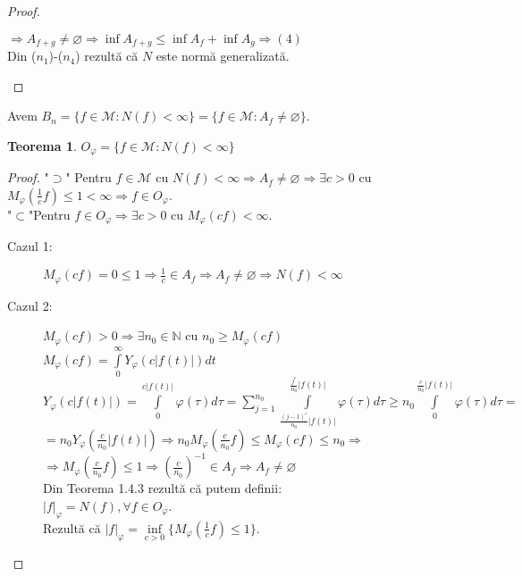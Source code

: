 \documentclass[ a4paper, 12pt]{report}
\newtheorem{theorem}{\bf Teorema}[section]
\theoremstyle{remark}
\numberwithin{equation}{section}
\begin{document}
\begin{proof}
\begin{enumerate}[($n_1$)]
$\Rightarrow A_{f+g} \neq \varnothing \Rightarrow \inf A_{f+g} \leq \inf A_f + \inf A_g \Rightarrow (4)$\\
Din ($n_1$)-($n_4$) rezult\u a c\u a $ N$ este norm\u a generalizat\u a.\\
\end{enumerate}
\end{proof}
\newpage
Avem $B_n = \{f \in \mathcal{M}: N(f) < \infty\} = \{f \in \mathcal{M}: A_f \neq \varnothing\}.$\\
\begin{theorem}
$O_\varphi =\{ f \in \mathcal{M}: N(f) < \infty\}$
\end{theorem}
\begin{proof}
"$\supset$" Pentru $f \in \mathcal{M}$ cu $N(f) < \infty \Rightarrow A_f \neq \varnothing \Rightarrow \exists c>0$ cu $M_\varphi \left (\frac{1}{c}f \right ) \leq 1 < \infty \Rightarrow f \in O_\varphi$.\\
"$\subset$"Pentru $f \in O_\varphi \Rightarrow \exists c >0$ cu $M_\varphi (cf) < \infty$.\\
\begin{description}

\item[Cazul 1:]$M_\varphi (cf) = 0 \leq 1 \Rightarrow \frac{1}{c} \in A_f \Rightarrow A_f \neq \varnothing \Rightarrow N(f)<\infty$

\item[Cazul 2:] $M_\varphi (cf) > 0 \Rightarrow \exists n_0 \in \mathbb{N}$ cu $n_0\geq M_\varphi (cf)$\\
$M_\varphi (cf) = \int\limits_{0}^{\infty} Y_\varphi (c \lvert f(t) \rvert) dt$\\
$Y_\varphi (c \lvert f(t) \rvert) = \int\limits_{0}^{c\lvert f(t) \rvert} \varphi(\tau) d\tau = \sum\limits_{j=1}^{n_0} \int\limits_{\frac{(j-1)^c}{n_0} \lvert f(t) \rvert}^{\frac{j^c}{n_0}\lvert f(t) \rvert} \varphi (\tau) d\tau \geq n_0 \int\limits_{0}^{\frac{c}{n_0} \lvert f(t) \rvert}  \varphi(\tau) d\tau =$\\ $= n_0 Y_\varphi\left (\frac{c}{n_0}\lvert f(t) \rvert \right) \Rightarrow n_0 M_\varphi \left (\frac{c}{n_0}f \right ) \leq M_\varphi (cf) \leq n_0 \Rightarrow $\\ $\Rightarrow M_\varphi \left (\frac{c}{n_0}f \right ) \leq 1 \Rightarrow (\frac{c}{n_0})^{-1} \in A_f \Rightarrow A_f \neq \varnothing $ \\
Din Teorema 1.4.3 rezult\u a c\u a putem  definii:\\
$\lvert f \rvert _\varphi = N(f) , \forall f \in O_\varphi$.\\
Rezult\u a c\u a $\lvert f \rvert _\varphi = \inf\limits_{c>0} \Big \{M_\varphi \left (\frac{1}{c}f \right )\leq 1 \Big \}$.
\end{description}
\end{proof}
\end{document}
